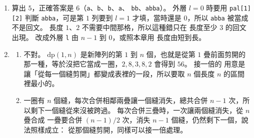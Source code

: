 \begin{enumerate}
\item 算出 $5$，正確答案是 $6$（\texttt{a}、\texttt{b}、\texttt{b}、\texttt{a}、
\texttt{bb}、\texttt{abba}）。 外層 $l = 0$ 時要用 \texttt{pal[1][2]} 判斷
\texttt{abba}，可是第 $1$ 列要到 $l = 1$ 才填，當時還是 $0$，所以
\texttt{abba} 被當成不是回文。 長度 $1$、$2$ 不需要中間那格，所以這種錯只在
長度至少 $3$ 的回文出現。 改成外層 \texttt{l} 由 $n - 1$ 到 $0$，或照本章用
長度由短到長。

\item
\begin{enumerate}
\item 不對。 $\mathrm{dp}(1, n)$ 是新陣列的第 $1$ 到 $n$ 個，也就是從第 $1$
疊前面剪開的那一種，等於沒把它當成一圈，$2, 8, 3, 8, 2$ 會得到 $56$。 接一倍的
用意是讓「從每一個縫剪開」都變成表裡的一段，所以要取 $n$ 個長度 $n$ 的區間
裡最小的。
\item 一圈有 $n$ 個縫，每次合併相鄰兩疊讓一個縫消失，總共合併 $n - 1$ 次，所
以剩下一個縫從來沒被跨過。 每次合併三疊時，一次讓兩個縫消失，從 $n$ 疊合成
一疊要合併 $(n - 1)/2$ 次，消失 $n - 1$ 個縫，仍然剩下一個，說法照樣成立：
從那個縫剪開，同樣可以接一倍處理。
\end{enumerate}
\end{enumerate}
